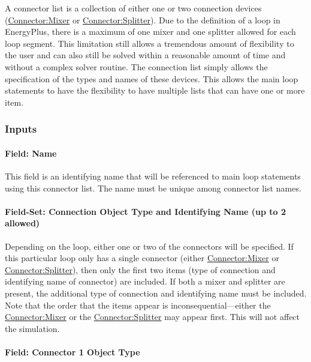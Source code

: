 A connector list is a collection of either one or two connection devices (\hyperref[connectormixer]{Connector:Mixer} or \hyperref[connectorsplitter]{Connector:Splitter}). Due to the definition of a loop in EnergyPlus, there is a maximum of one mixer and one splitter allowed for each loop segment. This limitation still allows a tremendous amount of flexibility to the user and can also still be solved within a reasonable amount of time and without a complex solver routine. The connection list simply allows the specification of the types and names of these devices. This allows the main loop statements to have the flexibility to have multiple lists that can have one or more item.

\subsubsection{Inputs}\label{inputs-3-021}

\paragraph{Field: Name}\label{field-name-3-019}

This field is an identifying name that will be referenced to main loop statements using this connector list. The name must be unique among connector list names.

\paragraph{Field-Set: Connection Object Type and Identifying Name (up to 2 allowed)}\label{field-set-connection-object-type-and-identifying-name-up-to-2-allowed}

Depending on the loop, either one or two of the connectors will be specified. If this particular loop only has a single connector (either \hyperref[connectormixer]{Connector:Mixer} or \hyperref[connectorsplitter]{Connector:Splitter}), then only the first two items (type of connection and identifying name of connector) are included. If both a mixer and splitter are present, the additional type of connection and identifying name must be included. Note that the order that the items appear is inconsequential---either the \hyperref[connectormixer]{Connector:Mixer} or the \hyperref[connectorsplitter]{Connector:Splitter} may appear first. This will not affect the simulation.

\paragraph{Field: Connector 1 Object Type}\label{field-connector-1-object-type}


